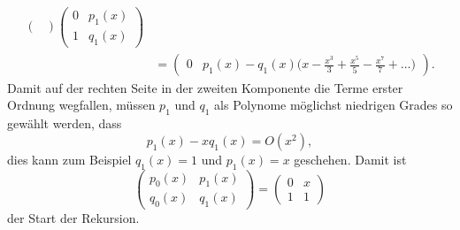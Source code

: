 \begin{refsection}
\begin{align*}
\begin{pmatrix}
\end{pmatrix}
\begin{pmatrix}
0&p_1(x)\\
1&q_1(x)
\end{pmatrix}
\\
&=
\begin{pmatrix}
0
&
p_1(x) - q_1(x)
\biggl(\displaystyle x-\frac{x^3}{3}+\frac{x^5}{5}-\frac{x^7}{7}+\dots\biggr)
\end{pmatrix}.
\end{align*}
Damit auf der rechten Seite in der zweiten Komponente die Terme erster Ordnung
wegfallen, müssen $p_1$ und $q_1$ als Polynome möglichst niedrigen Grades
so gewählt werden, dass
\[
p_1(x)-xq_1(x) = O(x^2),
\]
dies kann zum Beispiel $q_1(x)=1$ und $p_1(x)=x$ geschehen.
Damit ist
\[
\begin{pmatrix}
p_0(x)&p_1(x)\\
q_0(x)&q_1(x)
\end{pmatrix}
=
\begin{pmatrix}
0&x\\
1&1
\end{pmatrix}
\]
der Start der Rekursion.


\end{refsection}
